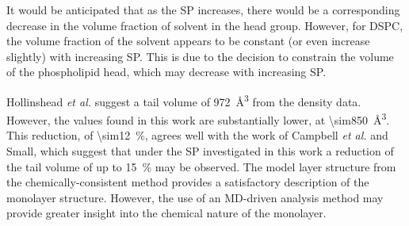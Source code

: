 It would be anticipated that as the SP increases, there would be a corresponding decrease in the volume fraction of solvent in the head group.
However, for DSPC, the volume fraction of the solvent appears to be constant (or even increase slightly) with increasing SP.
This is due to the decision to constrain the volume of the phospholipid head, which may decrease with increasing SP.

Hollinshead \emph{et al.} suggest a tail volume of \SI{972}{\angstrom\cubed} from the density data.
However, the values found in this work are substantially lower, at \SI{\sim850}{\angstrom\cubed}.
This reduction, of \SI{\sim12}{\percent}, agrees well with the work of Campbell \emph{et al.} and Small, which suggest that under the SP investigated in this work a reduction of the tail volume of up to \SI{15}{\percent} may be observed.
The model layer structure from the chemically-consistent method provides a satisfactory description of the monolayer structure.
However, the use of an MD-driven analysis method may provide greater insight into the chemical nature of the monolayer.

